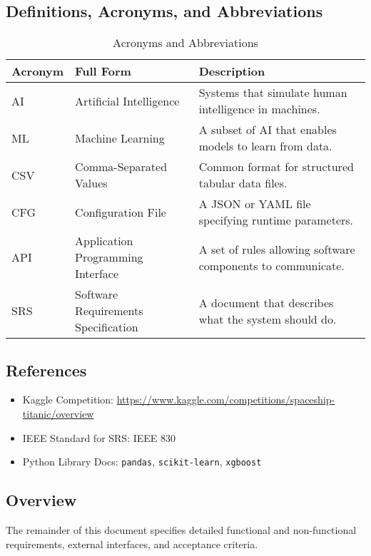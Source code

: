 \documentclass[15pt]{article}
\begin{document}
\subsection{Definitions, Acronyms, and Abbreviations}
\begin{table}[h!]
  \centering
  \begin{tabular}{|l|l|p{8cm}|}
  \hline
  \textbf{Acronym} & \textbf{Full Form}                       & \textbf{Description} \\
  \hline
  AI    & Artificial Intelligence                  & Systems that simulate human intelligence in machines. \\
  ML    & Machine Learning                         & A subset of AI that enables models to learn from data. \\
  CSV   & Comma-Separated Values                   & Common format for structured tabular data files. \\
  CFG   & Configuration File                       & A JSON or YAML file specifying runtime parameters. \\
  API   & Application Programming Interface        & A set of rules allowing software components to communicate. \\
  SRS   & Software Requirements Specification      & A document that describes what the system should do. \\
  \hline
  \end{tabular}
  \caption{Acronyms and Abbreviations}
\end{table}

\subsection{References}
\begin{itemize}
  \item Kaggle Competition: \url{https://www.kaggle.com/competitions/spaceship-titanic/overview}
  \item IEEE Standard for SRS: IEEE 830
  \item Python Library Docs: \texttt{pandas}, \texttt{scikit-learn}, \texttt{xgboost}
\end{itemize}

\subsection{Overview}
The remainder of this document specifies detailed functional and non-functional requirements, external interfaces, and acceptance criteria.
\end{document}
